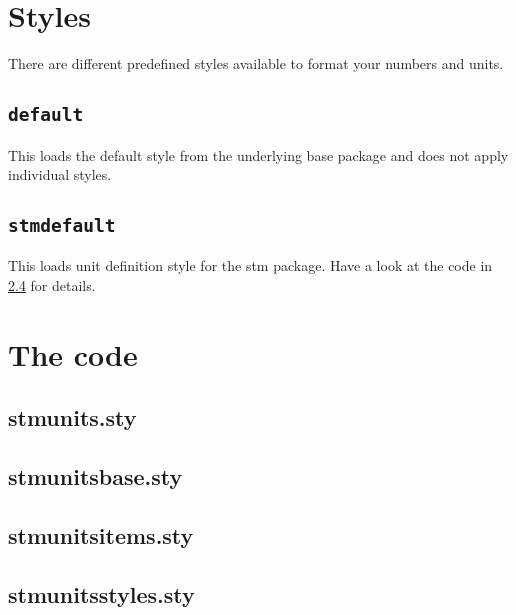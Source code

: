 \documentclass[%
  type=article,%
  layout=koma,%
  cleveref=true,%
  conditionallox=true,%
  conditionalloxnewpage=false,%
  date=true,%
  hyperref=true,%
  index=true,%
  listings=true,%
  math=true,%
]{stmtext}
\begin{document}
\section{Styles}
\label{sec:styles}

There are different predefined styles available to format your numbers and units.

\subsection{\protect\texttt{default}}
\label{sec:styles:default}

This loads the default style from the underlying base package and does not apply individual styles.

\subsection{\protect\texttt{stmdefault}}
\label{sec:styles:stmdefault}

This loads unit definition style for the stm package. Have a look at the code in \cref{sec:code:styles} for details.

\printstmindex

\newpage
\appendix

\section{The code}
\label{sec:code}

\subsection{stmunits.sty}
\label{sec:code:main}



\subsection{stmunitsbase.sty}
\label{sec:code:base}



\subsection{stmunitsitems.sty}
\label{sec:code:items}



\subsection{stmunitsstyles.sty}
\label{sec:code:styles}


\end{document}
